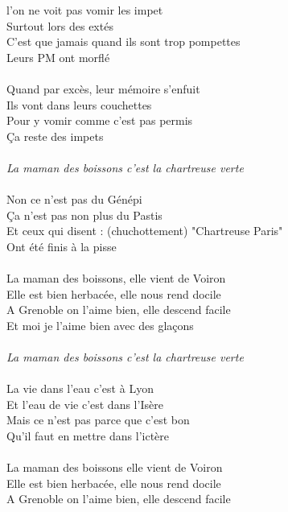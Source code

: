%
 l'on ne voit pas vomir les impet 
\\Surtout lors des extés 
\\C'est que jamais quand ils sont trop pompettes
\\Leurs PM ont morflé
\\\\Quand par excès, leur mémoire s'enfuit
\\Ils vont dans leurs couchettes
\\Pour y vomir comme c'est pas permis
\\Ça reste des impets 
\\\\\textit{La maman des boissons c'est la chartreuse verte}
\\\\Non ce n'est pas du Génépi 
\\Ça n'est pas non plus du Pastis 
\\Et ceux qui disent : (chuchottement) "Chartreuse Paris"
\\Ont été finis à la pisse 
\\\\La maman des boissons, elle vient de Voiron 
\\Elle est bien herbacée, elle nous rend docile 
\\A Grenoble on l'aime bien, elle descend facile 
\\Et moi je l'aime bien avec des glaçons 
\\\\\textit{La maman des boissons c'est la chartreuse verte}
\\\\La vie dans l'eau c'est à Lyon 
\\Et l'eau de vie c'est dans l'Isère 
\\Mais ce n'est pas parce que c'est bon 
\\Qu'il faut en mettre dans l'ictère 
\\\\La maman des boissons elle vient de Voiron 
\\Elle est bien herbacée, elle nous rend docile 
\\A Grenoble on l'aime bien, elle descend facile 

